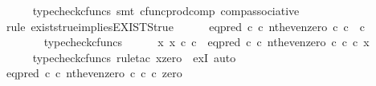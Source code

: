 \begin{isabellebody}
\ \ \ \ \isamarkupfalse%
\ {\isacharparenleft}{\kern0pt}typecheck{\isacharunderscore}{\kern0pt}cfuncs{\isacharcomma}{\kern0pt}\ smt\ cfunc{\isacharunderscore}{\kern0pt}prod{\isacharunderscore}{\kern0pt}comp\ comp{\isacharunderscore}{\kern0pt}associative{}{\isacharparenright}{\kern0pt}\isanewline
\ \ \isamarkupfalse%
\ \isamarkupfalse%
\ {\isachardoublequoteopen}{\isachardot}{\kern0pt}{\isachardot}{\kern0pt}{\isachardot}{\kern0pt}\ {\isacharequal}{\kern0pt}\ {\isasymt}{\isachardoublequoteclose}\isanewline
\ \ \isamarkupfalse%
\ {\isacharparenleft}{\kern0pt}rule\ exists{\isacharunderscore}{\kern0pt}true{\isacharunderscore}{\kern0pt}implies{\isacharunderscore}{\kern0pt}EXISTS{\isacharunderscore}{\kern0pt}true{\isacharparenright}{\kern0pt}\isanewline
\ \ \ \ \isamarkupfalse%
\ {\isachardoublequoteopen}eq{\isacharunderscore}{\kern0pt}pred\ {\isasymnat}\isactrlsub c\ {\isasymcirc}\isactrlsub c\ {\isasymlangle}nth{\isacharunderscore}{\kern0pt}even{\isacharcomma}{\kern0pt}zero\ {\isasymcirc}\isactrlsub c\ {\isasymbeta}\isactrlbsub {\isasymnat}\isactrlsub c\isactrlesub {\isasymrangle}\ {\isacharcolon}{\kern0pt}\ {\isasymnat}\isactrlsub c\ {\isasymrightarrow}\ {\isasymOmega}{\isachardoublequoteclose}\isanewline
\ \ \ \ \ \ \isamarkupfalse%
\ typecheck{\isacharunderscore}{\kern0pt}cfuncs\isanewline
\ \ \ \ \isamarkupfalse%
\ {\isachardoublequoteopen}{\isasymexists}x{\isachardot}{\kern0pt}\ x\ {\isasymin}\isactrlsub c\ {\isasymnat}\isactrlsub c\ {\isasymand}\ {\isacharparenleft}{\kern0pt}eq{\isacharunderscore}{\kern0pt}pred\ {\isasymnat}\isactrlsub c\ {\isasymcirc}\isactrlsub c\ {\isasymlangle}nth{\isacharunderscore}{\kern0pt}even{\isacharcomma}{\kern0pt}zero\ {\isasymcirc}\isactrlsub c\ {\isasymbeta}\isactrlbsub {\isasymnat}\isactrlsub c\isactrlesub {\isasymrangle}{\isacharparenright}{\kern0pt}\ {\isasymcirc}\isactrlsub c\ x\ {\isacharequal}{\kern0pt}\ {\isasymt}{\isachardoublequoteclose}\isanewline
\ \ \ \ \isamarkupfalse%
\ {\isacharparenleft}{\kern0pt}typecheck{\isacharunderscore}{\kern0pt}cfuncs{\isacharcomma}{\kern0pt}\ rule{\isacharunderscore}{\kern0pt}tac\ x{\isacharequal}{\kern0pt}{\isachardoublequoteopen}zero{\isachardoublequoteclose}\ \ exI{\isacharcomma}{\kern0pt}\ auto{\isacharparenright}{\kern0pt}\isanewline
\ \ \ \ \ \ \isamarkupfalse%
\ {\isachardoublequoteopen}{\isacharparenleft}{\kern0pt}eq{\isacharunderscore}{\kern0pt}pred\ {\isasymnat}\isactrlsub c\ {\isasymcirc}\isactrlsub c\ {\isasymlangle}nth{\isacharunderscore}{\kern0pt}even{\isacharcomma}{\kern0pt}zero\ {\isasymcirc}\isactrlsub c\ {\isasymbeta}\isactrlbsub {\isasymnat}\isactrlsub c\isactrlesub {\isasymrangle}{\isacharparenright}{\kern0pt}\ {\isasymcirc}\isactrlsub c\ zero\isanewline

\end{isabellebody}
